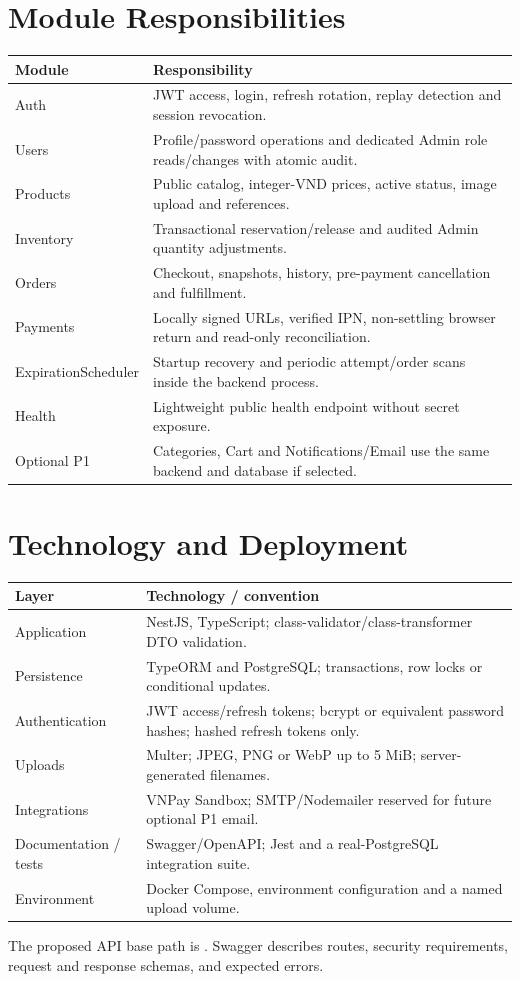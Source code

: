 \clearpage\section{Module Responsibilities}
\begin{tabularx}{\textwidth}{@{}p{34mm}X@{}}
\toprule
Module & Responsibility \\
\midrule
Auth & JWT access, login, refresh rotation, replay detection and session revocation. \\
Users & Profile/password operations and dedicated Admin role reads/changes with atomic audit. \\
Products & Public catalog, integer-VND prices, active status, image upload and references. \\
Inventory & Transactional reservation/release and audited Admin quantity adjustments. \\
Orders & Checkout, snapshots, history, pre-payment cancellation and fulfillment. \\
Payments & Locally signed URLs, verified IPN, non-settling browser return and read-only reconciliation. \\
ExpirationScheduler & Startup recovery and periodic attempt/order scans inside the backend process. \\
Health & Lightweight public health endpoint without secret exposure. \\
Optional P1 & Categories, Cart and Notifications/Email use the same backend and database if selected. \\
\bottomrule
\end{tabularx}

\section{Technology and Deployment}
\begin{tabularx}{\textwidth}{@{}p{38mm}X@{}}
\toprule
Layer & Technology / convention \\
\midrule
Application & NestJS, TypeScript; class-validator/class-transformer DTO validation. \\
Persistence & TypeORM and PostgreSQL; transactions, row locks or conditional updates. \\
Authentication & JWT access/refresh tokens; bcrypt or equivalent password hashes; hashed refresh tokens only. \\
Uploads & Multer; JPEG, PNG or WebP up to 5 MiB; server-generated filenames. \\
Integrations & VNPay Sandbox; SMTP/Nodemailer reserved for future optional P1 email. \\
Documentation / tests & Swagger/OpenAPI; Jest and a real-PostgreSQL integration suite. \\
Environment & Docker Compose, environment configuration and a named upload volume. \\
\bottomrule
\end{tabularx}

The proposed API base path is . Swagger describes routes, security requirements, request and response schemas, and expected errors.
